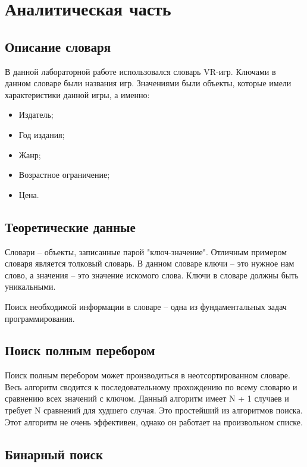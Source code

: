\chapter{Аналитическая часть}

\section{Описание словаря}

В данной лабораторной работе использовался словарь VR-игр.
Ключами в данном словаре были названия игр.
Значениями были объекты, которые имели характеристики данной игры, а именно:

\begin{itemize}
	\item Издатель;
	\item Год издания;
	\item Жанр;
	\item Возрастное ограничение;
	\item Цена.
\end{itemize}

\section{Теоретические данные}

Словари -- объекты, записанные парой "ключ-значение".
Отличным примером словаря является толковый словарь.
В данном словаре ключи -- это нужное нам слово, а значения --
это значение искомого слова. 
Ключи в словаре должны быть уникальными.

Поиск необходимой информации в словаре -- одна из фундаментальных
задач программирования.

\section{Поиск полным перебором}

Поиск полным перебором может производиться в неотсортированном словаре. 
Весь алгоритм сводится к последовательному прохождению 
по всему словарю и сравнению всех значений с ключом. 
Данный алгоритм имеет N + 1 случаев и
требует N сравнений для худшего случая.
Это простейший из алгоритмов поиска. 
Этот алгоритм не очень эффективен, однако 
он работает на произвольном списке.

\section{Бинарный поиск}

